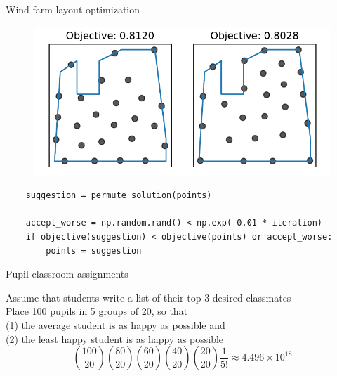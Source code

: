 \documentclass[12pt, aspectratio=149]{beamer}
\theoremstyle{plain}
\begin{document}
\begin{frame}[fragile]{Wind farm layout optimization}
\vspace*{-1em}
\begin{center}
 \begin{figure}
    	\centering
    	\includegraphics[width=0.99\linewidth]{figures/windfarm_sa}
 \end{figure}
 \end{center}
\vspace*{-2em}
\begin{center}
\begin{verbatim}
    suggestion = permute_solution(points)

    accept_worse = np.random.rand() < np.exp(-0.01 * iteration)
    if objective(suggestion) < objective(points) or accept_worse:
        points = suggestion
\end{verbatim}
\end{center}
\end{frame}


\begin{frame}[fragile]{Pupil-classroom assignments}
\vspace*{-1em}
\begin{center}
Assume that students write a list of their top-$3$ desired classmates \\
\vspace*{2em} 
Place 100 pupils in 5 groups of 20, so that \\
(1) the average student is as happy as possible and \\
(2) the least happy student is as happy as possible
\vspace*{1em} 
\begin{equation*}
\binom{100}{20}
\binom{80}{20}
\binom{60}{20}
\binom{40}{20}
\binom{20}{20}
\frac{1}{5!} \approx 4.496 \times 10^{18}
\end{equation*}
\end{center}
\end{frame}
\end{document}
